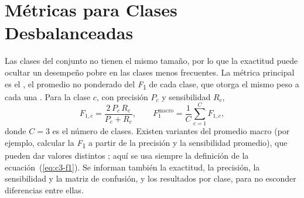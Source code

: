 \section{Métricas para Clases Desbalanceadas}
Las clases del conjunto no tienen el mismo tamaño, por lo que la exactitud puede ocultar un desempeño pobre en las clases menos frecuentes. La métrica principal es el \fmacro{}, el promedio no ponderado del \textit{F}\textsubscript{1} de cada clase, que otorga el mismo peso a cada una \parencite{sokolova2009}. Para la clase $c$, con precisión $P_c$ y sensibilidad $R_c$,
\begin{equation}
F_{1,c} = \frac{2\,P_c\,R_c}{P_c + R_c}, \qquad
F_{1}^{\mathrm{macro}} = \frac{1}{C}\sum_{c=1}^{C} F_{1,c},
\label{eq:c3-f1}
\end{equation}
donde $C = 3$ es el número de clases. Existen variantes del promedio macro (por ejemplo, calcular la \textit{F}\textsubscript{1} a partir de la precisión y la sensibilidad promedio), que pueden dar valores distintos \parencite{opitz2019}; aquí se usa siempre la definición de la ecuación~(\ref{eq:c3-f1}). Se informan también la exactitud, la precisión, la sensibilidad y la matriz de confusión, y los resultados por clase, para no esconder diferencias entre ellas.
